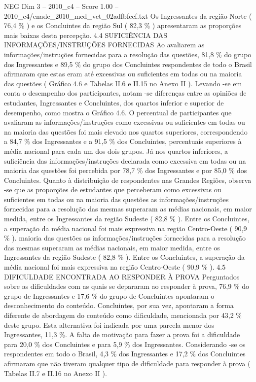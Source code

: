 \begin{textsample}{NEG Dim 3 – 2010\_c4 – Score 1.00 – 2010\_c4/enade\_2010\_med\_vet\_02adfbfccf.txt}
Os Ingressantes da região Norte ( 76,4 \% ) e os Concluintes da região Sul ( 82,3 \% ) apresentaram as proporções mais baixas desta percepção. 4.4 SUFICIÊNCIA DAS INFORMAÇÕES/INSTRUÇÕES FORNECIDAS Ao avaliarem as informações/instruções fornecidas para a resolução das questões, 81,8 \% do grupo dos Ingressantes e 89,5 \% do grupo dos Concluintes respondentes de todo o Brasil afirmaram que estas eram até excessivas ou suficientes em todas ou na maioria das questões ( Gráfico 4.6 e Tabelas II.6 e II.15 no Anexo II ).
Levando -se em conta o desempenho dos participantes, notam -se diferenças entre as opiniões de estudantes, Ingressantes e Concluintes, dos quartos inferior e superior de desempenho, como mostra o Gráfico 4.6.
O percentual de participantes que avaliaram as informações/instruções como excessivas ou suficientes em todas ou na maioria das questões foi mais elevado nos quartos superiores, correspondendo a 84,7 \% dos Ingressantes e a 91,5 \% dos Concluintes, percentuais superiores à média nacional para cada um dos dois grupos.
Já nos quartos inferiores, a suficiência das informações/instruções declarada como excessiva em todas ou na maioria das questões foi percebida por 78,7 \% dos Ingressantes e por 85,0 \% dos Concluintes.
Quanto à distribuição de respondentes nas Grandes Regiões, observa -se que as proporções de estudantes que perceberam como excessivas ou suficientes em todas ou na maioria das questões as informações/instruções fornecidas para a resolução das mesmas superaram as médias nacionais, em maior medida, entre os Ingressantes da região Sudeste ( 82,8 \% ).
Entre os Concluintes, a superação da média nacional foi mais expressiva na região Centro-Oeste ( 90,9 \% ). maioria das questões as informações/instruções fornecidas para a resolução das mesmas superaram as médias nacionais, em maior medida, entre os Ingressantes da região Sudeste ( 82,8 \% ).
Entre os Concluintes, a superação da média nacional foi mais expressiva na região Centro-Oeste ( 90,9 \% ). 4.5 DIFICULDADE ENCONTRADA AO RESPONDER À PROVA Perguntados sobre as dificuldades com as quais se depararam ao responder à prova, 76,9 \% do grupo de Ingressantes e 17,6 \% do grupo de Concluintes apontaram o desconhecimento do conteúdo.
Concluintes, por sua vez, apontaram a forma diferente de abordagem do conteúdo como dificuldade, mencionada por 43,2 \% deste grupo.
Esta alternativa foi indicada por uma parcela menor dos Ingressantes, 11,3 \%.
A falta de motivação para fazer a prova foi a dificuldade para 20,0 \% dos Concluintes e para 5,9 \% dos Ingressantes.
Considerando -se os respondentes em todo o Brasil, 4,3 \% dos Ingressantes e 17,2 \% dos Concluintes afirmaram que não tiveram qualquer tipo de dificuldade para responder à prova ( Tabelas II.7 e II.16 no Anexo II ).

\end{textsample}

